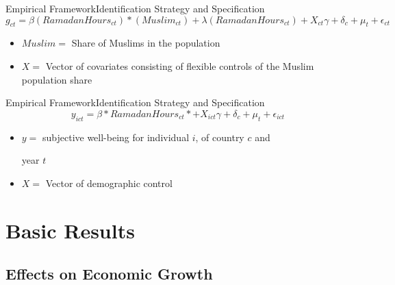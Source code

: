 \documentclass[pdftex,12pt,xcolor=pdftex,table]{beamer}
\begin{document}
    \begin{frame}{Empirical Framework}{Identification Strategy and Specification}
    \begin{equation}
    \nonumber g_{ct}=\beta(RamadanHours_{ct})*(Muslim_{ct})+\lambda(RamadanHours_{ct})
    
    +X_{ct}\gamma+\delta_c+\mu_t+\epsilon_{ct}
    \end{equation}
    \vspace{0.5cm}
    \begin{itemize}
    \item<2-> $Muslim=$ Share of Muslims in the population
    \item<3-> $X=$ Vector of covariates consisting of flexible controls of the Muslim population share
    \end{itemize}
    \end{frame}
    
    \begin{frame}{Empirical Framework}{Identification Strategy and Specification}
    \begin{equation}
    \nonumber y_{ict}=\beta*RamadanHours_{ct}*+X_{ict}\gamma+\delta_c+\mu_t+\epsilon_{ict}
    \end{equation}
    \vspace{0.5cm}
    \begin{itemize}
    \item<2-> $y=$ subjective well-being for individual $i$, of country $c$ and 
    
    year $t$
    \item<3-> $X=$ Vector of demographic control
    \end{itemize}
    \end{frame}
    
\section{Basic Results}

\subsection{Effects on Economic Growth}
\end{document}
